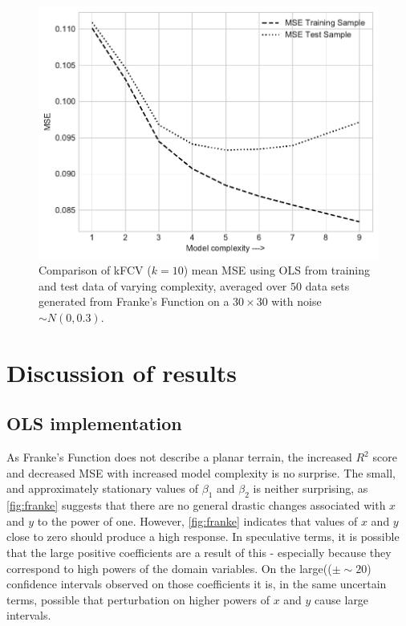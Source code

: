 \documentclass[%
oneside,                 %
final,                   %
10pt]{article}
\begin{document}
\begin{figure}[!h]
        \centering 
         \includegraphics[scale=0.7]{../Results/Part_C/bias_var_50runs.pdf} 
        \caption{Comparison of kFCV ($k=10$) mean MSE using OLS from training and test data of varying complexity, averaged over $50$ data sets generated from Franke's Function on a $30\times 30$ with noise $\sim N(0,0.3)$.}
        \label{fig:bias_var_OLS}   
\end{figure}  



\section{Discussion of results}
\subsection{OLS implementation}
As Franke's Function does not describe a planar terrain, the increased $R^2$ score and decreased MSE with increased model complexity  is no surprise.  The small, and approximately stationary values of $\beta_1$ and $\beta_2$  is neither surprising, as \ref{fig:franke} suggests that there are no general drastic changes associated with $x$ and $y$ to the power of one. However, \ref{fig:franke} indicates that values of $x$ and $y$ close to zero should produce a high response. In speculative terms, it is possible that the large positive coefficients are a result of this - especially because they correspond to high powers of the domain variables. On the large(($\pm \sim 20$) confidence intervals observed on those coefficients it is, in the same uncertain terms, possible that perturbation on higher powers of $x$ and $y$ cause large intervals. 
\end{document}
